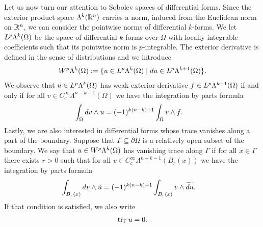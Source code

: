 \documentclass[10pt,letterpaper]{article}
\newcommand{\todo}[1]{{\colorbox{yellow}{#1}}}
\newcommand\cye[1]{%
\protect\leavevmode
\begingroup
    \color{red!35!yellow}%
    #1%
\endgroup
}
\newcommand{\mwl}[1]{{\color{red}#1}}
\begin{document}
Let us now turn our attention to Sobolev spaces of differential forms. 
Since the exterior product space $\Lambda^{k}({\mathbb R}^{n})$ carries a norm, induced from the Euclidean norm on ${\mathbb R}^{n}$, we can consider the pointwise norms of differential $k$-forms. 
We let $L^{p}\Lambda^{k}(\Omega)$ be the space of differential $k$-forms over $\Omega$ with locally integrable coefficients 
such that its pointwise norm is $p$-integrable. 
The exterior derivative is defined in the sense of distributions and we introduce 
\begin{gather*}
    W^{p}\Alt^{k}(\Omega) 
    := 
    \{ u \in L^{p}\Alt^{k}(\Omega) \suchthat \cartan u \in L^{p}\Alt^{k+1}(\Omega) \}
    .
\end{gather*}
We observe that $u \in L^{p}\Lambda^{k}(\Omega)$ has weak exterior derivative $f \in L^{p}\Lambda^{k+1}(\Omega)$
if and only if for all $v \in C^{\infty}_{c}\Lambda^{n-k-1}(\Omega)$ we have the integration by parts formula
\begin{align*}
    \int_{\Omega} d v \wedge u
    &=
    (-1)^{k(n-k)+1}
    \int_{\Omega} v \wedge f 
    .
\end{align*}
Lastly, we are also interested in differential forms whose trace vanishes along a part of the boundary. 
Suppose that $\Gamma \subseteq \partial\Omega$ is a relatively open subset of the boundary. 
We say that $u \in W^{p}\Lambda^{k}(\Omega)$ has vanishing trace along $\Gamma$ if for all $x \in \Gamma$ there exists $r > 0$
such that for all $v \in C^{\infty}_{c}\Lambda^{n-k-1}(B_r(x))$ we have the integration by parts formula
\begin{align*}
    \int_{B_r(x)} d v \wedge \tilde u
    &=
    (-1)^{k(n-k)+1}
    \int_{B_r(x)} v \wedge \widetilde{d u}
    .
\end{align*}
If that condition is satisfied, we also write 
\begin{align*}
    \operatorname{tr}_{\Gamma} u = 0
    .
\end{align*}
\end{document}
